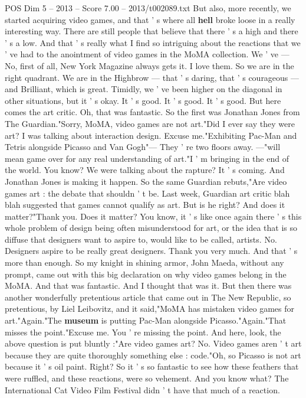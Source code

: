 \begin{textsample}{POS Dim 5 – 2013 – Score 7.00 – 2013/t002089.txt}
But also, more recently, we started acquiring video games, and that ' s where all \textbf{hell} broke loose in a really interesting way.
There are still people that believe that there ' s a high and there ' s a low.
And that ' s really what I find so intriguing about the reactions that we ' ve had to the anointment of video games in the MoMA collection.
We ' ve — No, first of all, New York Magazine always gets it.
I love them.
So we are in the right quadrant.
We are in the Highbrow — that ' s daring, that ' s courageous — and Brilliant, which is great.
Timidly, we ' ve been higher on the diagonal in other situations, but it ' s okay.
It ' s good.
It ' s good.
It ' s good.
But here comes the art critic.
Oh, that was fantastic.
So the first was Jonathan Jones from The Guardian."Sorry, MoMA, video games are not art."Did I ever say they were art?
I was talking about interaction design.
Excuse me."Exhibiting Pac-Man and Tetris alongside Picasso and Van Gogh"— They ' re two floors away. —"will mean game over for any real understanding of art."I ' m bringing in the end of the world.
You know?
We were talking about the rapture?
It ' s coming.
And Jonathan Jones is making it happen.
So the same Guardian rebuts,"Are video games art : the debate that shouldn ' t be.
Last week, Guardian art critic blah blah suggested that games cannot qualify as art.
But is he right?
And does it matter?"Thank you.
Does it matter?
You know, it ' s like once again there ' s this whole problem of design being often misunderstood for art, or the idea that is so diffuse that designers want to aspire to, would like to be called, artists.
No.
Designers aspire to be really great designers.
Thank you very much.
And that ' s more than enough.
So my knight in shining armor, John Maeda, without any prompt, came out with this big declaration on why video games belong in the MoMA.
And that was fantastic.
And I thought that was it.
But then there was another wonderfully pretentious article that came out in The New Republic, so pretentious, by Liel Leibovitz, and it said,"MoMA has mistaken video games for art."Again."The \textbf{museum} is putting Pac-Man alongside Picasso."Again."That misses the point."Excuse me.
You ' re missing the point.
And here, look, the above question is put bluntly :"Are video games art?
No.
Video games aren ' t art because they are quite thoroughly something else : code."Oh, so Picasso is not art because it ' s oil paint.
Right?
So it ' s so fantastic to see how these feathers that were ruffled, and these reactions, were so vehement.
And you know what?
The International Cat Video Film Festival didn ' t have that much of a reaction.

\end{textsample}
